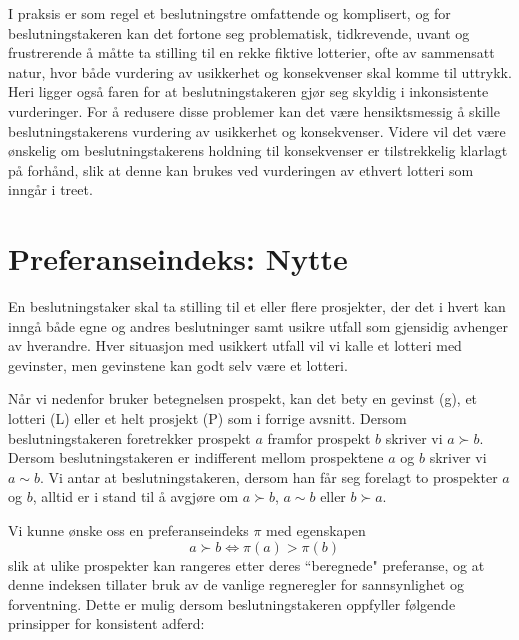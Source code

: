 {{I praksis er som regel et beslutningstre omfattende og komplisert, og for
beslutningstakeren kan det fortone seg problematisk, tidkrevende, uvant
og frustrerende å måtte ta stilling til en rekke fiktive 
lotterier, ofte av sammensatt natur, hvor både vurdering av 
usikkerhet og konsekvenser skal komme til uttrykk.  Heri ligger også
faren for at beslutningstakeren gjør seg skyldig i inkonsistente
vurderinger.  For å redusere disse problemer kan det være
hensiktsmessig å skille beslutningstakerens vurdering av usikkerhet
og konsekvenser.  Videre vil det være ønskelig om 
beslutningstakerens holdning til konsekvenser er tilstrekkelig klarlagt
på forhånd, slik at denne kan brukes ved vurderingen av ethvert
lotteri som inngår i treet.


\section{Preferanseindeks: Nytte}

En beslutningstaker skal ta stilling til et eller flere prosjekter, der det i 
hvert kan inngå både egne og andres beslutninger samt usikre utfall som
gjensidig avhenger av hverandre. Hver situasjon med usikkert utfall vil vi 
kalle et lotteri med gevinster, men gevinstene kan godt selv være et 
lotteri. 

Når vi nedenfor bruker betegnelsen prospekt, kan det bety
en gevinst (g), et lotteri (L) eller et helt prosjekt (P) som i forrige
avsnitt. Dersom 
beslutningstakeren foretrekker prospekt $a$ framfor prospekt $b$ skriver
vi $a\succ b$.  Dersom beslutningstakeren er indifferent mellom
prospektene $a$ og $b$ skriver vi $a\sim b$.  Vi antar at
beslutningstakeren, dersom han får seg forelagt to prospekter
$a$ og $b$, alltid er i stand til å avgjøre om $a\succ b$,
$a\sim b$ eller $b\succ a$.  

Vi kunne ønske oss en preferanseindeks $\pi$ med egenskapen
\[ \mbox{\ \ \ } a\succ b \Longleftrightarrow \pi (a) > \pi (b) \]
slik at ulike prospekter kan rangeres etter deres ``beregnede" preferanse,
og at denne indeksen tillater bruk av de vanlige regne\-regler for sannsynlighet 
og forventning. Dette er mulig dersom beslutnings\-takeren
oppfyller følgende prinsipper for konsistent adferd:

}}
